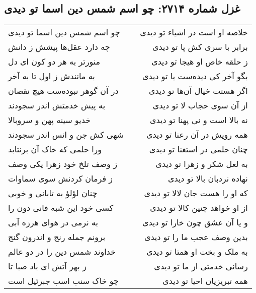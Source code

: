 \begin{center}
\section*{غزل شماره ۲۷۱۴: چو اسم شمس دین اسما تو دیدی}
\label{sec:2714}
\begin{longtable}{l p{0.5cm} r}
چو اسم شمس دین اسما تو دیدی
&&
خلاصه او است در اشیاء تو دیدی
\\
چه دارد عقل‌ها پیشش ز دانش
&&
برابر با سری کش پا تو دیدی
\\
منورتر به هر دو کون ای دل
&&
ز حلقه خاص او هیجا تو دیدی
\\
به مانندش ز اول تا به آخر
&&
بگو آخر کی دیده‌ست یا تو دیدی
\\
در آن گوهر نبوده‌ست هیچ نقصان
&&
اگر هستت خیال آن‌ها تو دیدی
\\
به پیش خدمتش اندر سجودند
&&
از آن سوی حجاب لا تو دیدی
\\
خدیو سینه پهن و سروبالا
&&
نه بالا است و نی پهنا تو دیدی
\\
شهی کش جن و انس اندر سجودند
&&
همه رویش در آن رعنا تو دیدی
\\
ورا حلمی که خاک آن برنتابد
&&
چنان حلمی در استغنا تو دیدی
\\
ز وصف تلخ خود زهرا یکی وصف
&&
به لعل شکر و زهرا تو دیدی
\\
ز فرمان کردنش سوی سماوات
&&
نهاده نردبان بالا تو دیدی
\\
چنان لؤلؤ به تابانی و خوبی
&&
که او را هست جان لالا تو دیدی
\\
کسی خود این شبه فانی دون را
&&
از او خواهد چنین کالا تو دیدی
\\
به نرمی در هوای هرزه آبی
&&
و یا آن عشق چون خارا تو دیدی
\\
برونم جمله رنج و اندرون گنج
&&
بدین وصف عجب ما را تو دیدی
\\
خداوند شمس دین را در دو عالم
&&
به ملک و بخت او همتا تو دیدی
\\
ز بهر آتش ای باد صبا تا
&&
رسانی خدمتی از ما تو دیدی
\\
چو خاک سنب اسب جبرئیل است
&&
همه تبریزیان احیا تو دیدی
\\
\end{longtable}
\end{center}

